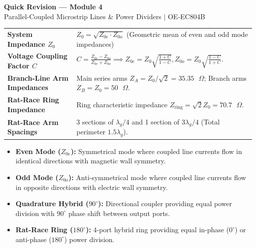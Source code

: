 \documentclass[10pt,a4paper]{article}
\begin{document}
\newpage
\begin{center}
  {\large\bfseries\color{myred} Quick Revision --- Module 4}\\[3pt]
  {\small\color{mydark} Parallel-Coupled Microstrip Lines \& Power Dividers $|$ OE-EC804B}
\end{center}
\noindent{\color{myred}\rule{\linewidth}{1.2pt}}
\vspace{4pt}

\begin{tcolorbox}[formulabox, title={\textbf{Key Concepts and Metrics at a Glance}}]
\renewcommand{\arraystretch}{1.35}
\begin{tabularx}{\linewidth}{>{\raggedright\arraybackslash\bfseries}p{4.5cm} X}
System Impedance $Z_0$ & $Z_0 = \sqrt{Z_{0e} \cdot Z_{0o}}$ \quad (Geometric mean of even and odd mode impedances) \\[4pt]
Voltage Coupling Factor $C$ & $C = \frac{Z_{0e} - Z_{0o}}{Z_{0e} + Z_{0o}} \implies Z_{0e} = Z_0 \sqrt{\frac{1+C}{1-C}}, Z_{0o} = Z_0 \sqrt{\frac{1-C}{1+C}}$. \\[4pt]
Branch-Line Arm Impedances & Main series arms $Z_A = Z_0 / \sqrt{2} = 35.35\text{ }\Omega$; Branch arms $Z_B = Z_0 = 50\text{ }\Omega$. \\[4pt]
Rat-Race Ring Impedance & Ring characteristic impedance $Z_{\text{ring}} = \sqrt{2} Z_0 = 70.7\text{ }\Omega$. \\[4pt]
Rat-Race Arm Spacings & 3 sections of $\lambda_g/4$ and 1 section of $3\lambda_g/4$ (Total perimeter $1.5\lambda_g$). \\
\end{tabularx}
\end{tcolorbox}

\begin{tcolorbox}[defbox, title={\textbf{One-Line Definitions}}]
  \begin{itemize}[leftmargin=*, noitemsep]
    \item \textbf{Even Mode ($Z_{0e}$):} Symmetrical mode where coupled line currents flow in identical directions with magnetic wall symmetry.
    \item \textbf{Odd Mode ($Z_{0o}$):} Anti-symmetrical mode where coupled line currents flow in opposite directions with electric wall symmetry.
    \item \textbf{Quadrature Hybrid ($90^\circ$):} Directional coupler providing equal power division with $90^\circ$ phase shift between output ports.
    \item \textbf{Rat-Race Ring ($180^\circ$):} 4-port hybrid ring providing equal in-phase ($0^\circ$) or anti-phase ($180^\circ$) power division.
  \end{itemize}
\end{tcolorbox}
\end{document}
